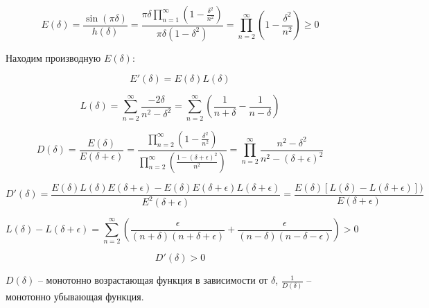 \begin{equation}
	\label{eq:equation72}
	E(\delta) = \frac{\sin(\pi \delta) }{h(\delta)} = \frac{\pi \delta \prod\limits_{n = 1}^\infty \left( 1- \frac{\delta^2}{n^2}\right)}{\pi \delta (1 - \delta^2)} = \prod\limits_{n = 2}^\infty \left( 1 - \frac{\delta^2}{n^2}\right) \geq 0 
\end{equation}

Находим производную $E(\delta)$:     

\begin{equation}
	\label{eq:equation73}
	E'(\delta) = E(\delta)L(\delta)
\end{equation}

\begin{equation}
	\label{eq:equation74}
	L(\delta) = \sum_{n=2}^{\infty} \frac{-2 \delta}{n^2 - \delta^2} = \sum_{n=2}^{\infty} \left(  \frac{1}{n + \delta} -  \frac{1}{n - \delta} \right) 
\end{equation}

\begin{equation}
	\label{eq:equation75}
	D(\delta) = \frac{E(\delta)}{E(\delta + \epsilon)} = \frac{\prod\limits_{n = 2}^\infty \left( 1 - \frac{\delta^2}{n^2} \right) }{\prod\limits_{n = 2}^\infty \left( \frac{1 - (\delta + \epsilon)^2}{n^2}\right)} = \prod\limits_{n = 2}^\infty \frac{n^2 - \delta^2}{n^2 - (\delta + \epsilon)^2}
\end{equation}

\begin{equation}
	\label{eq:equation76}
	D'(\delta) = \frac{E(\delta)L(\delta)E(\delta + \epsilon) - E(\delta)E(\delta + \epsilon)L(\delta + \epsilon)}{E^2 (\delta + \epsilon)} = \frac{E(\delta) [L(\delta) - L(\delta + \epsilon)])}{E(\delta + \epsilon)}
\end{equation}

\begin{equation}
	\label{eq:equation77}
	L(\delta) - L(\delta + \epsilon) = \sum_{n=2}^{\infty} \left(  \frac{\epsilon}{(n + \delta)(n + \delta + \epsilon)} + \frac{\epsilon}{(n - \delta)(n - \delta - \epsilon)} \right) > 0
\end{equation}

\begin{equation}
	\label{eq:equation78}
	D'(\delta) > 0 
\end{equation}

$D(\delta)$ -- монотонно возрастающая функция в зависимости от $\delta$, $\frac{1}{D(\delta)}$ -- монотонно убывающая функция. 

